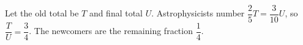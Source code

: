 Let the old total be $ T $ and final total $ U $. Astrophysicists number $\dfrac{2}{5}T=\dfrac{3}{10}U $, so $\dfrac{T}{U}=\dfrac{3}{4}$. The newcomers are the remaining fraction $\boxed{\dfrac{1}{4}}$.
